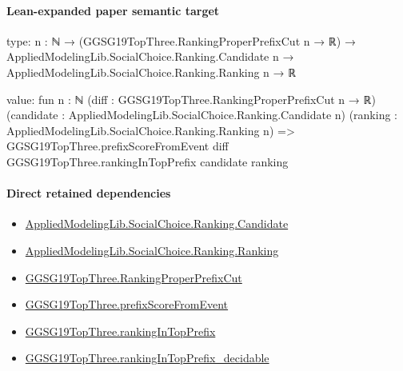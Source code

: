 \documentclass[10pt]{article}
\begin{document}
\paragraph{Lean-expanded paper semantic target}
\begin{ReviewVerbatim}
type:
{n : ℕ} →
  (GGSG19TopThree.RankingProperPrefixCut n → ℝ) →
    AppliedModelingLib.SocialChoice.Ranking.Candidate n → AppliedModelingLib.SocialChoice.Ranking.Ranking n → ℝ

value:
fun {n : ℕ} (diff : GGSG19TopThree.RankingProperPrefixCut n → ℝ)
    (candidate : AppliedModelingLib.SocialChoice.Ranking.Candidate n)
    (ranking : AppliedModelingLib.SocialChoice.Ranking.Ranking n) =>
  GGSG19TopThree.prefixScoreFromEvent diff GGSG19TopThree.rankingInTopPrefix candidate ranking
\end{ReviewVerbatim}

\paragraph{Direct retained dependencies}
\begin{itemize}\raggedright
\item \hyperlink{governing-declaration-8c0e6c25845ae78a}{Applied\allowbreak{}Modeling\allowbreak{}Lib.\allowbreak{}Social\allowbreak{}Choice.\allowbreak{}Ranking.\allowbreak{}Candidate}
\item \hyperlink{governing-declaration-5cde54446d1ae021}{Applied\allowbreak{}Modeling\allowbreak{}Lib.\allowbreak{}Social\allowbreak{}Choice.\allowbreak{}Ranking.\allowbreak{}Ranking}
\item \hyperlink{governing-declaration-22eb6cc53fca60ee}{GGSG19\allowbreak{}Top\allowbreak{}Three.\allowbreak{}Ranking\allowbreak{}Proper\allowbreak{}Prefix\allowbreak{}Cut}
\item \hyperlink{governing-declaration-933d55a812c83b25}{GGSG19\allowbreak{}Top\allowbreak{}Three.\allowbreak{}prefix\allowbreak{}Score\allowbreak{}From\allowbreak{}Event}
\item \hyperlink{governing-declaration-ce7e725ab38f4088}{GGSG19\allowbreak{}Top\allowbreak{}Three.\allowbreak{}ranking\allowbreak{}In\allowbreak{}Top\allowbreak{}Prefix}
\item \hyperlink{governing-declaration-aef2d1c6cef4b8ad}{GGSG19\allowbreak{}Top\allowbreak{}Three.\allowbreak{}ranking\allowbreak{}In\allowbreak{}Top\allowbreak{}Prefix\_\allowbreak{}decidable}
\end{itemize}
\end{document}
